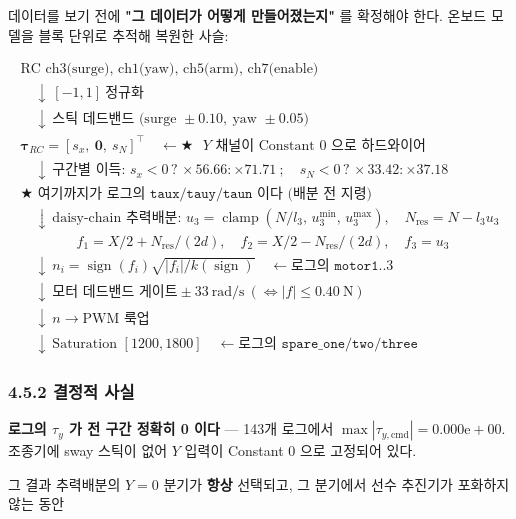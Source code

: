 \documentclass[10pt,a4paper]{article}
\begin{document}
데이터를 보기 전에 \textbf{"그 데이터가 어떻게 만들어졌는지"} 를 확정해야 한다. 온보드 모델을 블록 단위로 추적해 복원한 사슬:

\begin{equation*}
\begin{array}{l}
\text{RC ch3(surge), ch1(yaw), ch5(arm), ch7(enable)} \\
\quad\downarrow\ [-1,1]\ \text{정규화} \\
\quad\downarrow\ \text{스틱 데드밴드 (surge } \pm0.10,\ \text{yaw } \pm0.05) \\
\boldsymbol{\tau}_{RC} = [s_x,\ \mathbf{0},\ s_N]^\top
\quad \leftarrow \text{$\bigstar$ } Y \text{ 채널이 Constant 0 으로 하드와이어} \\
\quad\downarrow\ \text{구간별 이득: } s_x<0\,?\,{\times}56.66:{\times}71.71 \ ;\quad
s_N<0\,?\,{\times}33.42:{\times}37.18 \\
\textbf{$\bigstar$ 여기까지가 로그의 } \mathtt{taux/tauy/taun} \textbf{ 이다 (배분 전 지령)} \\
\quad\downarrow\ \text{daisy-chain 추력배분: }
u_3 = \operatorname{clamp}(N/l_3,\, u_3^{\min},\, u_3^{\max}),\quad
N_{\text{res}} = N - l_3 u_3 \\
\qquad\qquad f_1 = X/2 + N_{\text{res}}/(2d),\quad
f_2 = X/2 - N_{\text{res}}/(2d),\quad f_3 = u_3 \\
\quad\downarrow\ n_i = \operatorname{sign}(f_i)\sqrt{|f_i|/k(\operatorname{sign})}
\quad \leftarrow \text{로그의 } \mathtt{motor1..3} \\
\quad\downarrow\ \text{모터 데드밴드 게이트} \pm33\ \text{rad/s}\ (\Leftrightarrow |f| \le 0.40\ \text{N}) \\
\quad\downarrow\ n \to \text{PWM 룩업} \\
\quad\downarrow\ \text{Saturation } [1200, 1800]
\quad \leftarrow \text{로그의 } \mathtt{spare\_one/two/three}
\end{array} 
\end{equation*}

\subsubsection*{4.5.2 결정적 사실}

\textbf{로그의 $\tau_y$ 가 전 구간 정확히 0 이다} --- 143개 로그에서 $\max|\tau_{y,\text{cmd}}| = 0.000\mathrm{e}{+}00$. 조종기에 sway 스틱이 없어 $Y$ 입력이 Constant 0 으로 고정되어 있다.

그 결과 추력배분의 $Y = 0$ 분기가 \textbf{항상} 선택되고, 그 분기에서 선수 추진기가 포화하지 않는 동안
\end{document}
